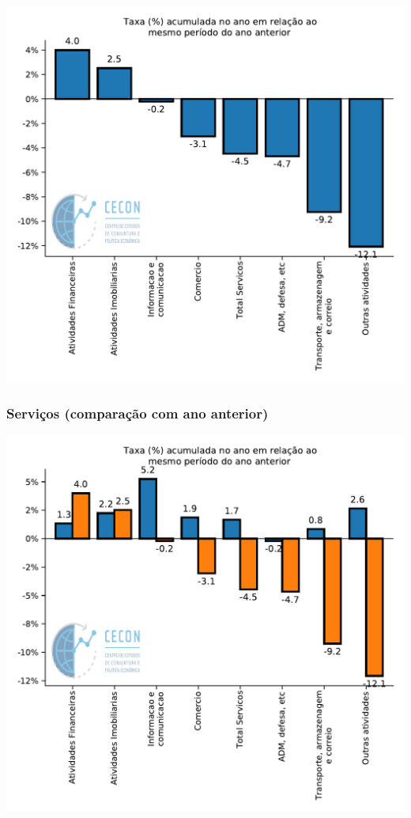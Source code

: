 \documentclass{SelfArx}
\begin{document}
\begin{center}
\includegraphics[width=.9\linewidth]{./figs/PIB/Servicos_Acum.pdf}
\end{center}

\subsubsection*{Serviços (comparação com ano anterior)}
\label{sec:orgeeda102}

\begin{center}
\includegraphics[width=.9\linewidth]{./figs/PIB/Servicos_Acum_Comparativo.pdf}
\end{center}
\end{document}
